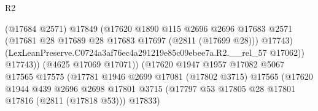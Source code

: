 \begin{lexlean}{R2}
\begin{coremodule}
                                              (@17684 @2571)
                                              @17849
                                              (@17620
                                                @1890
                                                @115
                                                @2696
                                                @2696
                                                @17683
                                                @2571
                                                (@17681
                                                  @28
                                                  @17689
                                                  @28
                                                  @17683
                                                  @17697
                                                  (@2811 (@17699 @28)))
                                                @17743)
                                              (LexLeanPreserve.C0724a3af76ec4a291219e85c09ebee7a.R2.__rel_57
                                                @17062))
                                            @17743))
                                        (@4625 @17069 @17071))
                                      (@17620
                                        @1947
                                        @1957
                                        @17082
                                        @5067
                                        @17565
                                        @17575
                                        (@17781
                                          @1946
                                          @2699
                                          @17081
                                          (@17802 @3715)
                                          @17565
                                          (@17620
                                            @1944
                                            @439
                                            @2696
                                            @2698
                                            @17801
                                            @3715
                                            (@17797
                                              @53
                                              @17805
                                              @28
                                              @17801
                                              @17816
                                              (@2811 (@17818 @53)))
                                            @17833)

\end{coremodule}
\end{lexlean}
